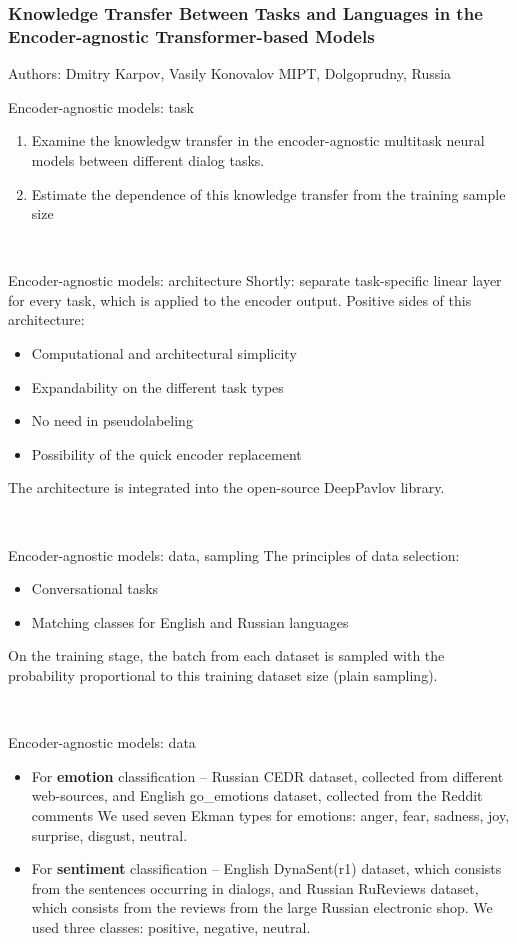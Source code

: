 \begin{frame}
    \setcounter{framenumber}{1}
    \frametitle{Knowledge Transfer Between Tasks and Languages in the Encoder-agnostic Transformer-based Models}
    Authors: Dmitry Karpov, Vasily Konovalov
    MIPT, Dolgoprudny, Russia
    
\end{frame}

\begin{frame}{Encoder-agnostic models: task}
\begin{enumerate}
    \item Examine the knowledgw transfer in the encoder-agnostic multitask neural models between different dialog tasks. 
    \item Estimate the dependence of this knowledge transfer from the training sample size
 \end{enumerate}
\end{frame}
​
\begin{frame}{Encoder-agnostic models: architecture}
Shortly: separate task-specific linear layer for every task, which is applied to the encoder output. 
Positive sides of this architecture:
\begin{itemize}
  \item Computational and architectural simplicity
  \item Expandability on the different task types
  \item No need in pseudolabeling
  \item Possibility of the quick encoder replacement
\end{itemize}
The architecture is integrated into the open-source DeepPavlov library.
\end{frame}
​
\begin{frame}{Encoder-agnostic models: data, sampling}
The principles of data selection:
\begin{itemize}
    \item Conversational tasks
    \item Matching classes for English and Russian languages
\end{itemize}
On the training stage, the batch from each dataset is sampled with the probability proportional to this training dataset size (plain sampling).
\end{frame}
​
\begin{frame}{Encoder-agnostic models: data }
\begin{itemize}
    \item For \textbf{emotion} classification -- Russian CEDR dataset, collected from different web-sources, and English go\_emotions dataset, collected from the Reddit comments
We used seven Ekman types for emotions: anger, fear, sadness, joy, surprise, disgust, neutral. 
    \item For \textbf{sentiment}  classification -- English DynaSent(r1) dataset, which consists from the sentences occurring in dialogs, and Russian RuReviews dataset, which consists from the reviews from the large Russian electronic shop. We used three classes: positive, negative, neutral. 
\end{itemize}
\end{frame}
